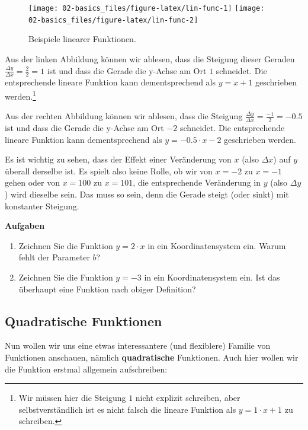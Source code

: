 \documentclass[
]{book}
\providecommand{\tightlist}{%
  \setlength{\itemsep}{0pt}\setlength{\parskip}{0pt}}
\begin{document}
\begin{figure}

{\centering \texttt{[image: 02-basics\_files/figure-latex/lin-func-1]} \texttt{[image: 02-basics\_files/figure-latex/lin-func-2]} 

}

\caption{Beispiele linearer Funktionen.}\label{fig:lin-func}
\end{figure}

Aus der linken Abbildung können wir ablesen, dass die Steigung dieser Geraden \(\frac{\Delta y}{\Delta x}=\frac{2}{2}=1\) ist und dass die Gerade die y-Achse am Ort \(1\) schneidet. Die entsprechende lineare Funktion kann dementsprechend als \(y = x + 1\) geschrieben werden.\footnote{Wir müssen hier die Steigung \(1\) nicht explizit schreiben, aber selbstverständlich ist es nicht falsch die lineare Funktion als \(y = 1\cdot x + 1\) zu schreiben.}

Aus der rechten Abbildung können wir ablesen, dass die Steigung \(\frac{\Delta y}{\Delta x}=\frac{-1}{2}=-0.5\) ist und dass die Gerade die y-Achse am Ort \(-2\) schneidet. Die entsprechende lineare Funktion kann dementsprechend als \(y = -0.5\cdot x -2\) geschrieben werden.

Es ist wichtig zu sehen, dass der Effekt einer Veränderung von \(x\) (also \(\Delta x\)) auf \(y\) überall derselbe ist. Es spielt also keine Rolle, ob wir von \(x=-2\) zu \(x=-1\) gehen oder von \(x=100\) zu \(x=101\), die entsprechende Veränderung in \(y\) (also \(\Delta y\)) wird dieselbe sein. Das muss so sein, denn die Gerade steigt (oder sinkt) mit konstanter Steigung.

\textbf{Aufgaben}

\begin{enumerate}
\def\labelenumi{\arabic{enumi}.}
\tightlist
\item
  Zeichnen Sie die Funktion \(y = 2\cdot x\) in ein Koordinatensystem ein. Warum fehlt der Parameter \(b\)?
\item
  Zeichnen Sie die Funktion \(y=-3\) in ein Koordinatensystem ein. Ist das überhaupt eine Funktion nach obiger Definition?
\end{enumerate}

\hypertarget{quadratische-funktionen}{%
\subsection{Quadratische Funktionen}\label{quadratische-funktionen}}

Nun wollen wir uns eine etwas interessantere (und flexiblere) Familie von Funktionen anschauen, nämlich \textbf{quadratische} Funktionen. Auch hier wollen wir die Funktion erstmal allgemein aufschreiben:
\end{document}

